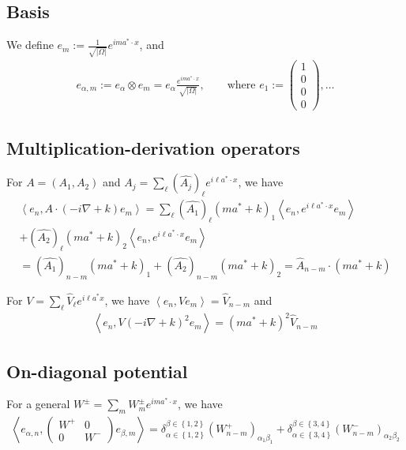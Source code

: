 \documentclass[11pt,a4paper,reqno,french,tikz]{amsart}
\newcommand{\pa}[1]{\left( #1 \right)} %
\newcommand{\acs}[1]{\left\{ #1 \right\}} %
\newcommand{\ab}[1]{\left|#1\right|} %
\newcommand{\ps}[1]{\left< #1 \right>} %
\newcommand{\na}{\nabla} %
\newcommand{\f}[2]{\frac{#1}{#2}} %
\newcommand{\mat}[1]{\begin{pmatrix} #1 \end{pmatrix}} %
\begin{document}
\subsection{Basis}%
\label{sub:basis}

We define $e_m := \f{1}{\sqrt{\ab{\Omega}}} e^{i m a^* \cdot x}$, and
\begin{align*}
e_{\alpha,m} := e_\alpha \otimes e_m = e_\alpha \f{e^{ima^*\cdot x}}{\sqrt{\ab{\Omega}}}, \qquad \text{where } e_1 := \mat{1 \\ 0 \\ 0 \\ 0},\dots
\end{align*}

\subsection{Multiplication-derivation operators}%

For $A = (A_1,A_2)$ and $A_j = \sum_\ell \pa{\widehat{A_j}}_\ell e^{i \ell a^*\cdot x}$, we have
\begin{multline*}
\ps{e_n, A \cdot (-i\na +k) e_m} = \sum_{\ell} \pa{\widehat{A_1}}_\ell \pa{ma^* + k}_1\ps{e_n, e^{i\ell a^*\cdot x} e_m} \\
+ \pa{\widehat{A_2}}_\ell \pa{ma^* + k}_2\ps{e_n, e^{i\ell a^*\cdot x} e_m} \\
= \pa{\widehat{A_1}}_{n-m} \pa{ma^* + k}_1 + \pa{\widehat{A_2}}_{n-m} \pa{ma^* + k}_2 = \widehat{A}_{n-m} \cdot \pa{ma^*+k}
\end{multline*}

For $V = \sum_\ell \widehat{V}_\ell e^{i\ell a^*x}$, we have $\ps{e_n,V e_m} = \widehat{V}_{n-m}$ and
\begin{align*}
\ps{e_n,V (-i\na + k)^2 e_m} =  \pa{ma^*+k}^2\widehat{V}_{n-m}
\end{align*}
\subsection{On-diagonal potential}%
\label{sub:on_diagonal_potential}



For a general $W^\pm = \sum_m W^\pm_m e^{im a^* \cdot x}$, we have
\begin{align*}
	\ps{e_{\alpha,n},\mat{W^+ & 0 \\ 0 & W^-} e_{\beta,m}} = \delta_{\alpha \in \acs{1,2}}^{\beta \in \acs{1,2}}\pa{W^+_{n-m}}_{\alpha_1 \beta_1} + \delta_{\alpha \in \acs{3,4}}^{\beta \in \acs{3,4}}\pa{W^-_{n-m}}_{\alpha_2 \beta_2}
\end{align*}
\end{document}
